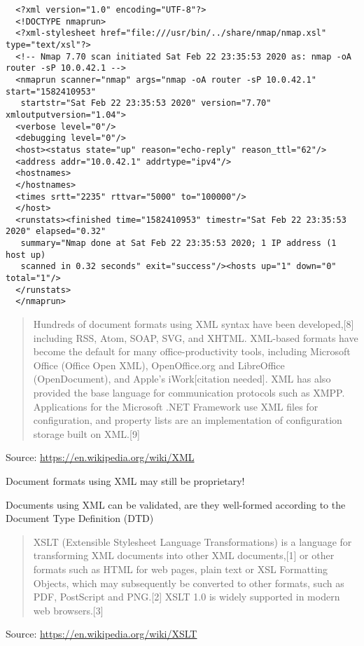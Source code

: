 \documentclass[Screen16to9,17pt]{foils}
\begin{document}
\begin{verbatim}
  <?xml version="1.0" encoding="UTF-8"?>
  <!DOCTYPE nmaprun>
  <?xml-stylesheet href="file:///usr/bin/../share/nmap/nmap.xsl" type="text/xsl"?>
  <!-- Nmap 7.70 scan initiated Sat Feb 22 23:35:53 2020 as: nmap -oA router -sP 10.0.42.1 -->
  <nmaprun scanner="nmap" args="nmap -oA router -sP 10.0.42.1" start="1582410953"
   startstr="Sat Feb 22 23:35:53 2020" version="7.70" xmloutputversion="1.04">
  <verbose level="0"/>
  <debugging level="0"/>
  <host><status state="up" reason="echo-reply" reason_ttl="62"/>
  <address addr="10.0.42.1" addrtype="ipv4"/>
  <hostnames>
  </hostnames>
  <times srtt="2235" rttvar="5000" to="100000"/>
  </host>
  <runstats><finished time="1582410953" timestr="Sat Feb 22 23:35:53 2020" elapsed="0.32"
   summary="Nmap done at Sat Feb 22 23:35:53 2020; 1 IP address (1 host up)
   scanned in 0.32 seconds" exit="success"/><hosts up="1" down="0" total="1"/>
  </runstats>
  </nmaprun>
\end{verbatim}



\begin{quote}
Hundreds of document formats using XML syntax have been developed,[8] including RSS, Atom, SOAP, SVG, and XHTML. XML-based formats have become the default for many office-productivity tools, including Microsoft Office (Office Open XML), OpenOffice.org and LibreOffice (OpenDocument), and Apple's iWork[citation needed]. XML has also provided the base language for communication protocols such as XMPP. Applications for the Microsoft .NET Framework use XML files for configuration, and property lists are an implementation of configuration storage built on XML.[9]
\end{quote}
Source: \url{https://en.wikipedia.org/wiki/XML}

\begin{list2}
\item Document formats using XML may still be proprietary!
\item Documents using XML can be validated, are they well-formed according to the Document Type Definition (DTD)
\end{list2}

\begin{quote}


XSLT (Extensible Stylesheet Language Transformations) is a language for transforming XML documents into other XML documents,[1] or other formats such as HTML for web pages, plain text or XSL Formatting Objects, which may subsequently be converted to other formats, such as PDF, PostScript and PNG.[2] XSLT 1.0 is widely supported in modern web browsers.[3]
\end{quote}
Source: \url{https://en.wikipedia.org/wiki/XSLT}
\end{document}
